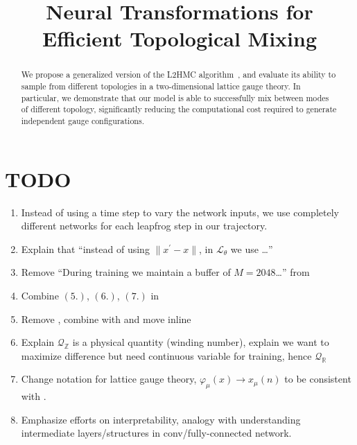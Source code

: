 \documentclass{article} %
\title{Neural Transformations for \\Efficient Topological Mixing}%
\author{Sam Foreman, Xiao-Yong Jin\& James Osborn\thanks{\hyperref{%
      https://github.com/saforem2/l2hmc-qcd
   }{https://github.com/saforem2/l2hmc-qcd} \\
   Leadership Computing Facility\\
   Argonne National Laboratory\\
   Lemont, IL 60439
   \texttt{\{foremans,xjin,\}@anl.gov},%
   \texttt{\{osborn\}@alcf.anl.gov}\\
}}
\begin{document}
\maketitle

\begin{abstract}
   We propose a generalized version of the L2HMC algorithm~\citep{levy2017}, and evaluate its ability to sample from
   different topologies in a two-dimensional lattice gauge theory.
   In particular, we demonstrate that our model is able to successfully mix between modes of different topology,
   significantly reducing the computational cost required to generate independent gauge configurations.
\end{abstract}

\section{TODO}
\begin{enumerate}
   \item Instead of using a time step to vary the network inputs, we use completely different networks for each leapfrog
      step in our trajectory.
   \item Explain that ``instead of using \(\|x^{\prime}-x\|\), in \(\mathcal{L}_{\theta}\) we use \ldots''
   \item Remove ``During training we maintain a buffer of \(M=2048\)\ldots'' from 
   \item Combine \((5.)\), \((6.)\), \((7.)\) in 
   \item Remove , combine with  and move inline
   \item Explain \(\mathcal{Q}_{\mathbb{Z}}\) is a physical quantity (winding number), explain we want to maximize
      difference but need continuous variable for training, hence \(\mathcal{Q}_{\mathbb{R}}\)
   \item Change notation for lattice gauge theory, \(\varphi_{\mu}(x)\rightarrow x_{\mu}(n)\) to be consistent with
      .
   \item Emphasize efforts on interpretability, analogy with understanding intermediate layers/structures in
      conv/fully-connected network.
\end{enumerate}
%
\end{document}
